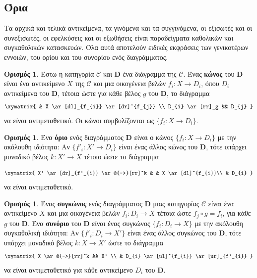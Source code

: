 \documentclass [a4paper,11pt] {book}
\theoremstyle{definition}
\theoremstyle{definition}
\newtheorem{definition}[theorem]{Ορισμός}
\begin{document}
\subsection{Όρια}
\label{limits}
Τα αρχικά και τελικά αντικείμενα, τα γινόμενα και τα συγγινόμενα, οι εξισωτές και οι συνεξισωτές, οι εφελκύσεις και οι εξωθήσεις είναι παραδείγματα καθολικών και συγκαθολικών κατασκευών. Όλα αυτά αποτελούν ειδικές εκφράσεις των γενικοτέρων εννοιών, του ορίου και του συνορίου ενός διαγράμματος.
\begin{definition}\label{cone}
Έστω η κατηγορία $\mathcal{C}$ και \textbf{D} ένα διάγραμμα της $\mathcal{C}$. Ένας \textbf{κώνος} του \textbf{D} είναι ένα αντικείμενο $X$ της $\mathcal{C}$ και μια οικογένεια βελών $f_{i}:X\to D_{i}$, όπου $D_{i}$ αντικείμενα του \textbf{D}, τέτοια ώστε για κάθε βέλος $g$ του \textbf{D}, το διάγραμμα
\begin{displaymath}
\xymatrix{
 & X \ar[dl]_{f_{i}} \ar[dr]^{f_{j}} \\
D_{i} \ar[rr]_g && D_{j}
}
\end{displaymath}
να είναι αντιμεταθετικό. Οι κώνοι συμβολίζονται ως $\{ f_{i}:X\to D_{i} \}$.
\end{definition}
\begin{definition}\label{limit}
Ένα \textbf{όριο} ενός διαγράμματος \textbf{D} είναι ο κώνος $\{ f_{i}:X\to D_{i} \}$ με την ακόλουθη ιδιότητα:
Αν $\{ f'_{i}:X'\to D_{i} \}$ είναι ένας άλλος κώνος του \textbf{D}, τότε υπάρχει μοναδικό βέλος $k:X' \to X$ τέτοιο ώστε το διάγραμμα

\begin{displaymath}
\xymatrix{
X' \ar[dr]_{f'_{i}} \ar@{-->}[rr]^k & & X \ar[dl]^{f_{i}}\\
& D_{i}
}
\end{displaymath}
να είναι αντιμεταθετικό.
\end{definition}
\begin{definition}\label{colimit}
Ένας \textbf{συγκώνος} ενός διαγράμματος \textbf{D} μιας κατηγορίας $\mathcal{C}$ είναι ένα αντικείμενο $X$ και μια οικογένεια βελών $f_{i}:D_{i}\to X$ τέτοια ώστε $f_{j}\circ g=f_{i}$, για κάθε $g$ του \textbf{D}. Ένα \textbf{συνόριο} του \textbf{D} είναι ένας συγκώνος $\{ f_{i}:D_{i}\to X \}$ με την ακόλουθη συγκαθολική ιδιότητα: Αν $\{ f'_{i}:D_{i}\to X'  \}$ είναι ένας άλλος συγκώνος του \textbf{D}, τότε υπάρχει μοναδικό βέλος  $k:X \to X'$ ώστε το διάγραμμα
\begin{displaymath}
\xymatrix{
X \ar@{-->}[rr]^k && X' \\
& D_{i} \ar[ul]^{f_{i}} \ar[ur]_{f'_{i}}
}
\end{displaymath}
να είναι αντιμεταθετικό για κάθε αντικείμενο $D_{i}$ του \textbf{D}.
\end{definition}
\end{document}
